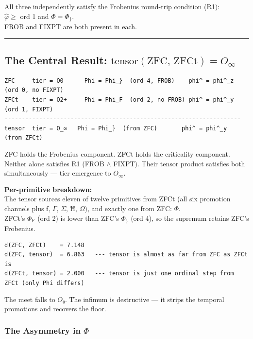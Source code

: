 \documentclass[12pt,a4paper]{article}
\begin{document}
All three independently satisfy the Frobenius round-trip condition (R1): \\
$\hat{\varphi} \geq$ ord 1 and $\Phi = \Phi_{\}}$. \\
FROB and FIXPT are both present in each.

\begin{center}
\rule{0.5\textwidth}{0.4pt}
\end{center}

\subsection*{The Central Result: $\mathrm{tensor}(\mathrm{ZFC},\,\mathrm{ZFCt}) = O_\infty$}

\begin{lstlisting}
ZFC     tier = O0      Phi = Phi_}  (ord 4, FROB)    phi^ = phi^_z  (ord 0, no FIXPT)
ZFCt    tier = O2+     Phi = Phi_F  (ord 2, no FROB) phi^ = phi^_y  (ord 1, FIXPT)
--------------------------------------------------------------------
tensor  tier = O_∞   Phi = Phi_}  (from ZFC)       phi^ = phi^_y  (from ZFCt)
\end{lstlisting}

ZFC holds the Frobenius component. ZFCt holds the criticality component. \\
Neither alone satisfies R1 (FROB $\land$ FIXPT). Their tensor product satisfies both simultaneously --- tier emergence to $O_\infty$.

\textbf{Per-primitive breakdown:} \\
The tensor sources eleven of twelve primitives from ZFCt (all six promotion channels plus ƒ, $\Gamma$, $\Sigma$, Ħ, $\Omega$), and exactly one from ZFC: $\Phi$. \\
ZFCt's $\Phi_{\text{F}}$ (ord 2) is lower than ZFC's $\Phi_{\}}$ (ord 4), so the supremum retains ZFC's Frobenius.

\begin{lstlisting}
d(ZFC, ZFCt)    = 7.148
d(ZFC, tensor)  = 6.863   --- tensor is almost as far from ZFC as ZFCt is
d(ZFCt, tensor) = 2.000   --- tensor is just one ordinal step from ZFCt (only Phi differs)
\end{lstlisting}

The meet falls to $O₀$. The infimum is destructive --- it strips the temporal promotions and recovers the floor.

\subsubsection*{The Asymmetry in $\Phi$}
\end{document}
